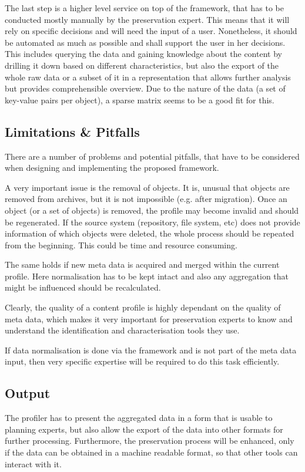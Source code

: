 The last step is a higher level service on top of the framework, that has to be conducted mostly manually by the preservation expert. This means that it will rely on specific decisions and will need the input of a user. Nonetheless, it should be automated as much as possible and shall support the user in her decisions. This includes querying the data and gaining knowledge about the content by drilling it down based on different characteristics, but also the export of the whole raw data or a subset of it in a representation that allows further analysis but provides comprehensible overview.
Due to the nature of the data (a set of key-value pairs per object), a sparse matrix seems to be a good fit for this.

\subsection{Limitations \& Pitfalls}
There are a number of problems and potential pitfalls, that have to be considered when designing and implementing the proposed framework.

A very important issue is the removal of objects. It is, unusual that objects are removed from archives, but it is not impossible (e.g. after migration). Once an object (or a set of objects) is removed, the profile may become invalid and should be regenerated. If the source system (repository, file system, etc) does not provide information of which objects were deleted, the whole process should be repeated from the beginning. This could be time and resource consuming.

The same holds if new meta data is acquired and merged within the current profile. Here normalisation has to be kept intact and also any aggregation that might be influenced should be recalculated.

Clearly, the quality of a content profile is highly dependant on the quality of meta data, which makes it very important for preservation experts to know and understand the identification and characterisation tools they use.

If data normalisation is done via the framework and is not part of the meta data input, then very specific expertise will be required to do this task efficiently.

\subsection{Output}
The profiler has to present the aggregated data in a form that is usable to planning experts, but also allow the export of the data into other formats for further processing. Furthermore, the preservation process will be enhanced, only if the data
can be obtained in a machine readable format, so that other tools can interact with it.

